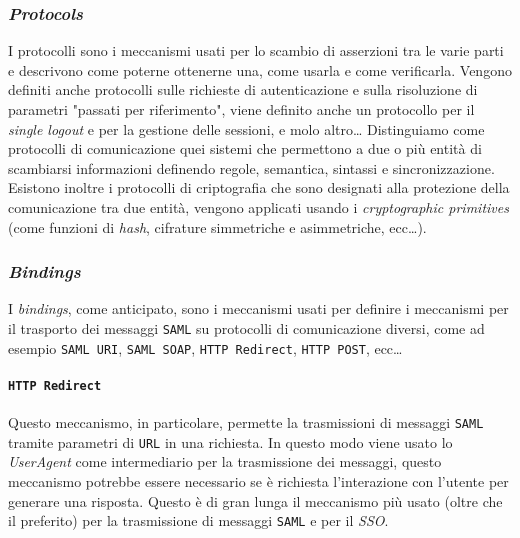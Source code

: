         \subsubsection{\textit{Protocols}}
            I protocolli sono i meccanismi usati per lo scambio di asserzioni tra le varie parti e descrivono come poterne ottenerne una, come usarla e come verificarla. Vengono definiti anche protocolli sulle richieste di autenticazione e sulla risoluzione di parametri "passati per riferimento", viene definito anche un protocollo per il \textit{single logout} e per la gestione delle sessioni, e molo altro\dots\newline
            Distinguiamo come protocolli di comunicazione quei sistemi che permettono a due o più entità di scambiarsi informazioni definendo regole, semantica, sintassi e sincronizzazione. Esistono inoltre i protocolli di criptografia che sono designati alla protezione della comunicazione tra due entità, vengono applicati usando i \textit{cryptographic primitives} (come funzioni di \textit{hash}, cifrature simmetriche e asimmetriche, ecc\dots).
        \subsubsection{\textit{Bindings}}
            I \textit{bindings}, come anticipato, sono i meccanismi usati per definire i meccanismi per il trasporto dei messaggi \texttt{SAML} su protocolli di comunicazione diversi, come ad esempio \texttt{SAML URI}, \texttt{SAML SOAP}, \texttt{HTTP Redirect}, \texttt{HTTP POST}, ecc\dots
            \paragraph{\texttt{HTTP Redirect}} Questo meccanismo, in particolare, permette la trasmissioni di messaggi \texttt{SAML} tramite parametri di \texttt{URL} in una richiesta. In questo modo viene usato lo \textit{UserAgent} come intermediario per la trasmissione dei messaggi, questo meccanismo potrebbe essere necessario se è richiesta l'interazione con l'utente per generare una risposta. Questo è di gran lunga il meccanismo più usato (oltre che il preferito) per la trasmissione di messaggi \texttt{SAML} e per il \textit{SSO}.